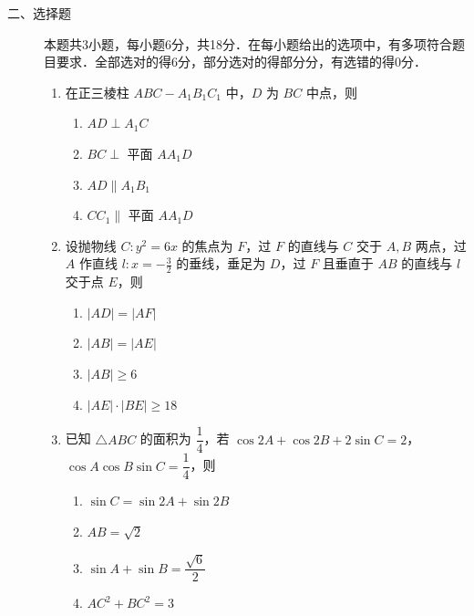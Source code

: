 \begin{description}
    \item[二、选择题] 本题共3小题，每小题6分，共18分．在每小题给出的选项中，有多项符合题目要求．全部选对的得6分，部分选对的得部分分，有选错的得0分．
    \begin{enumerate}[leftmargin=5pt]
      \addtocounter{enumi}{+8}
        \item 在正三棱柱 $ABC-A_1B_1C_1$ 中，$D$ 为 $BC$ 中点，则
        \begin{enumerate}[label=\Alph*.]
            \item $AD\perp A_1C$
            \item $BC\perp$ 平面 $AA_1D$
            \item $AD\parallel A_1B_1$
            \item $CC_1\parallel$ 平面 $AA_1D$
        \end{enumerate}

        \item 设抛物线 $C:y^2=6x$ 的焦点为 $F$，过 $F$ 的直线与 $C$ 交于 $A,B$ 两点，过 $A$ 作直线 $l:x=-\frac{3}{2}$ 的垂线，垂足为 $D$，过 $F$ 且垂直于 $AB$ 的直线与 $l$ 交于点 $E$，则
        \begin{enumerate}[label=\Alph*.]
            \item $|AD|=|AF|$
            \item $|AB|=|AE|$
            \item $|AB|\geqslant6$
            \item $|AE|\cdot|BE|\geqslant18$
        \end{enumerate}

        \item 已知 $\triangle ABC$ 的面积为 $\dfrac{1}{4}$，若 $\cos2A+\cos2B+2\sin C=2$，$\cos A\cos B\sin C=\dfrac{1}{4}$，则
        \begin{enumerate}[label=\Alph*.]
            \item $\sin C=\sin2A+\sin2B$
            \item $AB=\sqrt{2}$
            \item $\sin A+\sin B=\dfrac{\sqrt{6}}{2}$
            \item $AC^2+BC^2=3$
        \end{enumerate}
    \end{enumerate}
\end{description}

